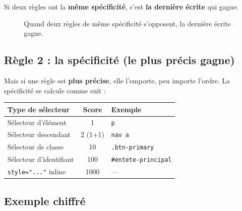 \documentclass[11pt,a4paper]{article}
\begin{document}
Si deux règles ont la \textbf{même spécificité}, c'est \textbf{la dernière
écrite} qui gagne.

\begin{figure}[!ht]
\centering
{}
\caption{Quand deux règles de même spécificité s'opposent, la dernière écrite gagne.}
\label{fig:cascade}
\end{figure}

\subsection{Règle 2 : la spécificité (le plus précis gagne)}

Mais si une règle est \textbf{plus précise}, elle l'emporte, peu importe
l'ordre. La spécificité se calcule comme suit :

\begin{center}
\begin{tabular}{@{}lcl@{}}
\toprule
\textbf{Type de sélecteur} & \textbf{Score} & \textbf{Exemple} \\
\midrule
Sélecteur d'élément       & 1   & \texttt{p}              \\
Sélecteur descendant      & 2 (1+1) & \texttt{nav a}     \\
Sélecteur de classe       & 10  & \texttt{.btn-primary}   \\
Sélecteur d'identifiant   & 100 & \texttt{\#entete-principal} \\
\texttt{style="..."} inline & 1000 & --- \\
\bottomrule
\end{tabular}
\end{center}

\subsection{Exemple chiffré}
\end{document}
